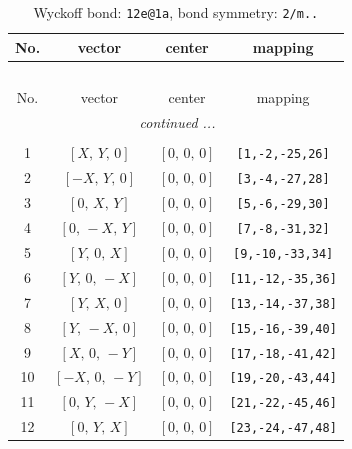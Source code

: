 \documentclass[fleqn,8pt]{jsarticle}
\begin{document}
\begin{longtable}{cccc}
\caption{Wyckoff bond: {\tt 12e@1a}, bond symmetry: {\tt 2/m..}}
 \\
 \hline \hline
No. & vector & center & mapping \\ \hline \endfirsthead

\multicolumn{3}{l}{\tablename\ \thetable{}} \\
 \hline \hline
No. & vector & center & mapping \\ \hline \endhead

 \hline \hline
\multicolumn{3}{r}{\footnotesize\it continued ...} \\ \endfoot

 \hline \hline
\multicolumn{3}{r}{} \\ \endlastfoot

1 & $\left[ X,\, Y,\, 0 \right]$ & $\left[ 0,\, 0,\, 0 \right]$ & {\tt [1,-2,-25,26]} \\ \hline
2 & $\left[ - X,\, Y,\, 0 \right]$ & $\left[ 0,\, 0,\, 0 \right]$ & {\tt [3,-4,-27,28]} \\ \hline
3 & $\left[ 0,\, X,\, Y \right]$ & $\left[ 0,\, 0,\, 0 \right]$ & {\tt [5,-6,-29,30]} \\ \hline
4 & $\left[ 0,\, - X,\, Y \right]$ & $\left[ 0,\, 0,\, 0 \right]$ & {\tt [7,-8,-31,32]} \\ \hline
5 & $\left[ Y,\, 0,\, X \right]$ & $\left[ 0,\, 0,\, 0 \right]$ & {\tt [9,-10,-33,34]} \\ \hline
6 & $\left[ Y,\, 0,\, - X \right]$ & $\left[ 0,\, 0,\, 0 \right]$ & {\tt [11,-12,-35,36]} \\ \hline
7 & $\left[ Y,\, X,\, 0 \right]$ & $\left[ 0,\, 0,\, 0 \right]$ & {\tt [13,-14,-37,38]} \\ \hline
8 & $\left[ Y,\, - X,\, 0 \right]$ & $\left[ 0,\, 0,\, 0 \right]$ & {\tt [15,-16,-39,40]} \\ \hline
9 & $\left[ X,\, 0,\, - Y \right]$ & $\left[ 0,\, 0,\, 0 \right]$ & {\tt [17,-18,-41,42]} \\ \hline
10 & $\left[ - X,\, 0,\, - Y \right]$ & $\left[ 0,\, 0,\, 0 \right]$ & {\tt [19,-20,-43,44]} \\ \hline
11 & $\left[ 0,\, Y,\, - X \right]$ & $\left[ 0,\, 0,\, 0 \right]$ & {\tt [21,-22,-45,46]} \\ \hline
12 & $\left[ 0,\, Y,\, X \right]$ & $\left[ 0,\, 0,\, 0 \right]$ & {\tt [23,-24,-47,48]} \\
\end{longtable}
\renewcommand{\arraystretch}{1.2}
\end{document}
